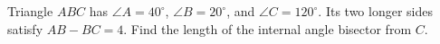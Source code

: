Triangle $ABC$ has $\angle A=40^\circ$, $\angle B=20^\circ$, and $\angle C=120^\circ$. Its two longer sides satisfy $AB-BC=4$. Find the length of the internal angle bisector from $C$.
